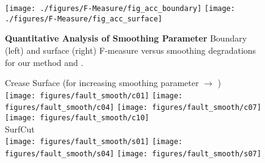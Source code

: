 \documentclass[10pt,journal,compsoc]{IEEEtran}
\begin{document}
\def\fHeightFm{2.2cm}
\begin{figure}
  \centering
  \texttt{[image: ./figures/F-Measure/fig\_acc\_boundary]}
  \texttt{[image: ./figures/F-Measure/fig\_acc\_surface]}
  \caption{{\bf Quantitative Analysis of Smoothing Parameter}
    Boundary (left) and surface (right) F-measure versus smoothing degradations for our method and \cite{schultz2010crease}. }
  \label{fig:smoothing_expt}
\end{figure}

\def\fHeightFaultSmoothing{0.45in}
\begin{figure}
  \centering
  \footnotesize
  {Crease Surface (for increasing smoothing parameter $\rightarrow$ ) \\
    \texttt{[image: figures/fault\_smooth/c01]} 
    \texttt{[image: figures/fault\_smooth/c04]} 
    \texttt{[image: figures/fault\_smooth/c07]} 
    \texttt{[image: figures/fault\_smooth/c10]} \\
    SurfCut \\
    \texttt{[image: figures/fault\_smooth/s01]} 
    \texttt{[image: figures/fault\_smooth/s04]} 
    \texttt{[image: figures/fault\_smooth/s07]} 
}
\end{figure}
\end{document}
